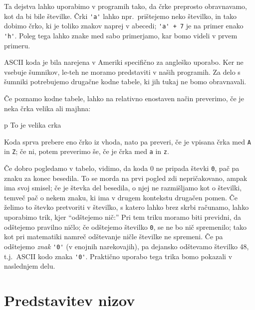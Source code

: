 Ta dejstva lahko uporabimo v programih tako, da črke preprosto obravnavamo, kot
da bi bile številke.
Črki \verb+'a'+ lahko npr.~prištejemo neko številko, in tako dobimo črko, ki je
toliko znakov naprej v abecedi; \verb|'a' + 7| je na primer enako \verb|'h'|.
Poleg tega lahko znake med sabo primerjamo, kar bomo videli v prvem primeru.

\begin{errors}
  ASCII koda je bila narejena v Ameriki specifično za angleško uporabo.
  Ker ne vsebuje šumnikov, le-teh ne moramo predstaviti v naših programih.
  Za delo s šumniki potrebujemo drugačne kodne tabele, ki jih tukaj ne bomo
  obravnavali.
\end{errors}

\begin{examples}
  Če poznamo kodne tabele, lahko na relativno enostaven način preverimo, če je
  neka črka velika ali majhna:
  \begin{inout}
	p
	\tcblower
	To je velika crka
  \end{inout}
  Koda sprva prebere eno črko iz vhoda, nato pa preveri, če je vpisana črka med
  \verb+A+ in \verb+Z+; če ni, potem preverimo še, če je črka med \verb+a+ in
  \verb+z+.
\end{examples}

Če dobro pogledamo v tabelo, vidimo, da koda 0 ne pripada števki \verb+0+, pač
pa znaku za konec besedila.
To se morda na prvi pogled zdi nepričakovano, ampak ima svoj smisel; če je
števka del besedila, o njej ne razmišljamo kot o številki, temveč pač o nekem
znaku, ki ima v drugem kontekstu drugačen pomen.
Če želimo to števko pretvoriti v številko, s katero lahko brez skrbi računamo,
lahko uporabimo trik, kjer ``odštejemo nič:''
Pri tem triku moramo biti previdni, da odštejemo pravilno ničlo; če odštejemo
številko \verb+0+, se ne bo nič spremenilo; tako kot pri matematiki namreč
odštevanje ničle številke ne spremeni.
Če pa odštejemo \emph{znak} \verb+'0'+ (v enojnih narekovajih), pa dejansko
odštevamo številko 48, t.j.~ASCII kodo znaka \verb+'0'+.
Praktično uporabo tega trika bomo pokazali v naslednjem delu.

\section{Predstavitev nizov}

